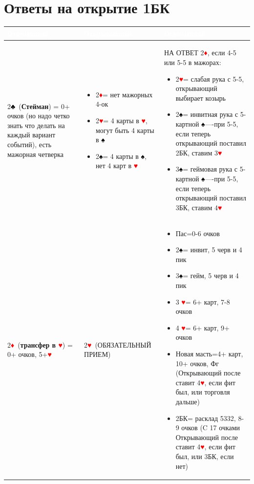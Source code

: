 \documentclass[a4paper,10pt]{article}
\newcommand{\clb}{\textcolor{black}{♣}}
\newcommand{\dia}{\textcolor{red}{♦}}
\newcommand{\hrt}{\textcolor{red}{♥}}
\newcommand{\spd}{\textcolor{black}{♠}}
\newcommand{\NT}{БК}
\begin{document}
\section{Ответы на открытие 1\NT}
\noindent
\begin{tabularx}{\textwidth}{|X|X|X|}
\hline
\rowcolor{tableHeader} \textcolor{white}{\textbf{Отвечающий}} & \textcolor{white}{\textbf{Открывающий}} & \textcolor{white}{\textbf{Отвечающий}} \\ \hline
2\clb\ (\textbf{Стейман}) = 0+ очков (но надо четко знать что делать на каждый вариант событий), есть мажорная четверка & 
\begin{itemize}[label=\textcolor{sputnikRed}{\tiny\(\blacksquare\)}, leftmargin=*, nosep]
    \item 2\dia = нет мажорных 4-ок
    \item 2\hrt = 4 карты в \hrt, могут быть 4 карты в \spd
    \item 2\spd = 4 карты в \spd , нет 4 карт в \hrt
\end{itemize}&
НА ОТВЕТ 2\dia, если 4-5 или 5-5 в мажорах:
\begin{itemize}[label=\textcolor{sputnikRed}{\tiny\(\blacksquare\)}, leftmargin=*, nosep]
    \item 2\hrt= слабая рука с 5-5, открывающий выбирает козырь
    \item 2\spd = инвитная рука с 5-картной \spd----при 5-5, если теперь открывающий поставил 2\NT, ставим 3\hrt
    \item 3\spd = геймовая рука с 5-картной \spd----при 5-5, если теперь открывающий поставил 3\NT, ставим 4\hrt
\end{itemize}
\\ \hline
2\dia\ (\textbf{трансфер в \hrt}) = 0+ очков, 5+\hrt & 2\hrt\ (ОБЯЗАТЕЛЬНЫЙ ПРИЕМ) &
\begin{itemize}[label=\textcolor{sputnikRed}{\tiny\(\blacksquare\)}, leftmargin=*, nosep]
    \item Пас=0-6 очков
    \item 2\spd = инвит, 5 черв и 4 пик
    \item 3\spd = гейм, 5 черв и 4 пик
    \item 3 \hrt = 6+ карт, 7-8 очков
    \item 4 \hrt = 6+ карт, 9+ очков
    \item Новая масть=4+ карт, 10+ очков, Фг (Открывающий после ставит 4\hrt, если фит был, или торговля дальше)
    \item 2\NT = расклад 5332, 8-9 очков (C 17 очками Открывающий после ставит 4\hrt, если фит был, или 3\NT, если нет)

\end{itemize}
\end{tabularx}
\end{document}
